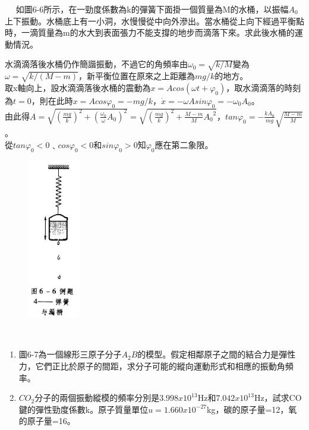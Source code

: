 \documentclass[cn,10pt,math=newtx,chinesefont=founder]{elegantbook}
\begin{document}
\newpage


\begin{example}　
    如圖6-6所示，在一勁度係數為k的彈簧下面掛一個質量為M的水桶，以振幅$A_0$上下振動。水桶底上有一小洞，水慢慢從中向外滲出。當水桶從上向下經過平衡點時，一滴質量為m的水大到表面張力不能支撐的地步而滴落下來。求此後水桶的運動情況。
     
    \rightline{[4]}
    
\end{example}

\begin{solution}
水滴滴落後水桶仍作簡諧振動，不過它的角頻率由$\omega_0=\sqrt{k/M}$變為$\omega = \sqrt{k/(M-m)}$，新平衡位置在原來之上距離為$mg/k$的地方。\\
取x軸向上，設水滴滴落後水桶的震動為$x = Acos(\omega t + \varphi_0)$，取水滴滴落的時刻為$t=0$，則在此時$x = Acos\varphi_0 = -mg/k$，$\Dot{x} = -\omega Asin\varphi_0 = -\omega_0 A_0$。\\
由此得$A = \sqrt{{(\frac{mg}{k})}^2 + {(\frac{\omega_0}{\omega}A_0)}^2} = \sqrt{{(\frac{mg}{k})}^2 + \frac{M-m}{M}{A_0}^2}$，$tan\varphi_0 = -\frac{kA_0}{mg}\sqrt{\frac{M-m}{M}}$。\\
從$tan\varphi_0 < 0$﹑$cos\varphi_0 < 0$和$sin\varphi_0 > 0$知$\varphi_0$應在第二象限。
\end{solution}

\begin{figure}[htbp]
\flushright
\includegraphics[width=0.2\textwidth]{image/6-6-4.JPG}
\end{figure}

\newpage


\begin{example}　
    \begin{enumerate}[label=(\arabic*)]
    \item 圖6-7為一個線形三原子分子$A_2B$的模型。假定相鄰原子之間的結合力是彈性力，它們正比於原子的間距，求分子可能的縱向運動形式和相應的振動角頻率。
    \item $CO_2$分子的兩個振動縱模的頻率分別是$3.998x10^{13}$Hz和$7.042x10^{13}$Hz，試求CO鍵的彈性勁度係數k。原子質量單位$u = 1.660x10^{-27}$kg，碳的原子量=12，氧的原子量=16。
    \end{enumerate}
     
    \rightline{[5]}
    
\end{example}
\end{document}
